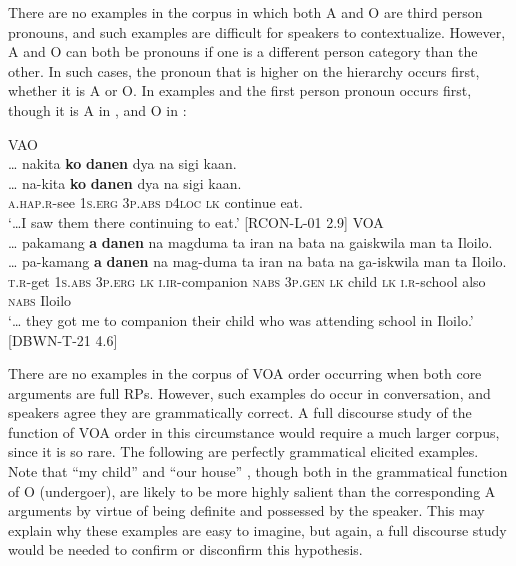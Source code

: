 \largerpage%
There are no examples in the corpus in which both A and O are third person pronouns, and such examples are difficult for speakers to contextualize. However, A and O can both be pronouns if one is a different person category than the other. In such cases, the pronoun that is higher on the hierarchy occurs first, whether it is A or O. In examples  and  the first person pronoun occurs first, though it is A in , and O in :

\ea 
\label{bkm:Ref113973505}
\hspace{.4cm}V\hspace{.8cm}A\hspace{.3cm}O \\
… nakita  \textbf{ko}  \textbf{danen}  dya  na  sigi  kaan. \\\smallskip
\gll … na-kita  \textbf{ko}  \textbf{danen}  dya  na  sigi  kaan. \\
{} \textsc{a.hap.r}-see  1\textsc{s.erg}  3\textsc{p.abs}  \textsc{d}4\textsc{loc}  \textsc{lk}  continue  eat. \\
\glt ‘…I saw them there continuing to eat.’ [RCON-L-01 2.9]
\z
\ea
\label{bkm:Ref113973510}
\hspace{.4cm}V\hspace{1.4cm}O\hspace{.1cm}A \\
… pakamang  \textbf{a}  \textbf{danen}  na  magduma  ta  iran  na  bata na  gaiskwila  man  ta  Iloilo. \\\smallskip
\gll … pa-kamang  \textbf{a}  \textbf{danen}  na  mag-duma  ta  iran  na  bata na  ga-iskwila  man  ta  Iloilo. \\
{} \textsc{t.r}-get  1\textsc{s.abs}  3\textsc{p.erg}  \textsc{lk}  \textsc{i.ir}-companion  \textsc{nabs}  3\textsc{p.gen}  \textsc{lk}  child
\textsc{lk}  \textsc{i.r}-school  also  \textsc{nabs}  Iloilo \\
\glt `… they  got me to companion their child who was attending school in Iloilo.’ [DBWN-T-21 4.6]
\z 

There are no examples in the corpus of VOA order occurring when both core arguments are full RPs. However, such examples do occur in conversation, and speakers agree they are grammatically correct. A full discourse study of the function of VOA order in this circumstance would require a much larger corpus, since it is so rare. The following are perfectly grammatical elicited examples. Note that “my child”  and “our house” , though both in the grammatical function of O (undergoer), are likely to be more highly salient than the corresponding A arguments by virtue of being definite and possessed by the speaker. This may explain why these examples are easy to imagine, but again, a full discourse study would be needed to confirm or disconfirm this hypothesis.

